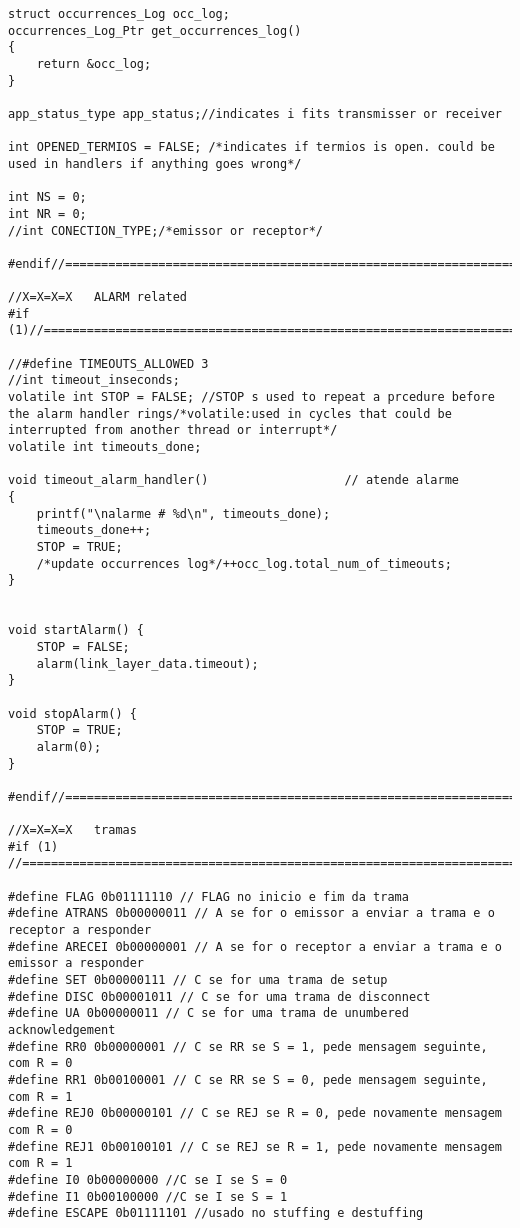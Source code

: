 \begin{lstlisting}
struct occurrences_Log occ_log;
occurrences_Log_Ptr get_occurrences_log()
{
	return &occ_log;
}

app_status_type app_status;//indicates i fits transmisser or receiver

int OPENED_TERMIOS = FALSE; /*indicates if termios is open. could be used in handlers if anything goes wrong*/

int NS = 0;
int NR = 0;
//int CONECTION_TYPE;/*emissor or receptor*/

#endif//==========================================================================

//X=X=X=X   ALARM related
#if (1)//==========================================================================

//#define TIMEOUTS_ALLOWED 3
//int timeout_inseconds;
volatile int STOP = FALSE; //STOP s used to repeat a prcedure before the alarm handler rings/*volatile:used in cycles that could be interrupted from another thread or interrupt*/
volatile int timeouts_done;

void timeout_alarm_handler()                   // atende alarme
{
	printf("\nalarme # %d\n", timeouts_done);
	timeouts_done++;
	STOP = TRUE;
	/*update occurrences log*/++occ_log.total_num_of_timeouts;
}


void startAlarm() {
	STOP = FALSE;
	alarm(link_layer_data.timeout);
}

void stopAlarm() {
	STOP = TRUE;
	alarm(0);
}

#endif//==========================================================================

//X=X=X=X   tramas
#if (1)
//===============================================================================

#define FLAG 0b01111110 // FLAG no inicio e fim da trama
#define ATRANS 0b00000011 // A se for o emissor a enviar a trama e o receptor a responder
#define ARECEI 0b00000001 // A se for o receptor a enviar a trama e o emissor a responder
#define SET 0b00000111 // C se for uma trama de setup
#define DISC 0b00001011	// C se for uma trama de disconnect
#define UA 0b00000011 // C se for uma trama de unumbered acknowledgement
#define RR0 0b00000001 // C se RR se S = 1, pede mensagem seguinte, com R = 0
#define RR1 0b00100001 // C se RR se S = 0, pede mensagem seguinte, com R = 1
#define REJ0 0b00000101 // C se REJ se R = 0, pede novamente mensagem com R = 0
#define REJ1 0b00100101 // C se REJ se R = 1, pede novamente mensagem com R = 1
#define I0 0b00000000 //C se I se S = 0
#define I1 0b00100000 //C se I se S = 1
#define ESCAPE 0b01111101 //usado no stuffing e destuffing


\end{lstlisting}
